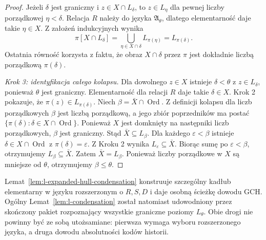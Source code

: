 \begin{proof}
Jeżeli $\delta$ jest graniczny i $z\in X\cap L_\delta$,
to $z\in L_\eta$ dla pewnej liczby porządkowej
$\eta<\delta$. Relacja $R$ należy do języka
$\mathfrak A_\theta$, dlatego elementarność daje
takie $\eta\in X$. Z założeń indukcyjnych wynika
\[
\pi[X\cap L_\delta]
=\bigcup_{\eta\in X\cap\delta}L_{\pi(\eta)}
=L_{\pi(\delta)}.
\]
Ostatnia równość korzysta z faktu, że obraz
$X\cap\delta$ przez $\pi$ jest dokładnie
liczbą porządkową $\pi(\delta)$.

\emph{Krok 3: identyfikacja całego kolapsu.}
Dla dowolnego $z\in X$ istnieje $\delta<\theta$
z $z\in L_\delta$, ponieważ $\theta$ jest graniczny.
Elementarność dla relacji $R$ daje takie $\delta\in X$.
Krok 2 pokazuje, że $\pi(z)\in L_{\pi(\delta)}$.
Niech $\beta=\bar X\cap\operatorname{Ord}$.
Z definicji kolapsu dla liczb porządkowych
$\beta$ jest liczbą porządkową, a jego zbiór
poprzedników ma postać
$\{\pi(\delta):\delta\in X\cap\operatorname{Ord}\}$.
Ponieważ $X$ jest domknięty na następniki liczb
porządkowych, $\beta$ jest graniczny.
Stąd $\bar X\subseteq L_\beta$.
Dla każdego $\varepsilon<\beta$ istnieje
$\delta\in X\cap\operatorname{Ord}$
z $\pi(\delta)=\varepsilon$. Z Kroku 2 wynika
$L_\varepsilon\subseteq\bar X$.
Biorąc sumę po $\varepsilon<\beta$,
otrzymujemy $L_\beta\subseteq\bar X$.
Zatem $\bar X=L_\beta$. Ponieważ liczby porządkowe
w $X$ są mniejsze od $\theta$, otrzymujemy
$\beta\le\theta$.
\end{proof}

\begin{uwaga}
\label{rem:l-expanded-vs-full-condensation}
Lemat~\ref{lem:l-expanded-hull-condensation}
konstruuje szczególny kadłub elementarny
w języku rozszerzonym o $R,S,D$ i daje osobną
ścieżkę dowodu GCH. Ogólny
Lemat~\ref{lem:l-condensation} został natomiast
udowodniony przez skończony pakiet rozpoznający
wszystkie graniczne poziomy $L_\theta$.
Obie drogi nie powinny być ze sobą utożsamiane:
pierwsza wymaga wyboru rozszerzonego języka,
a druga dowodu absolutności kodów historii.
\end{uwaga}

